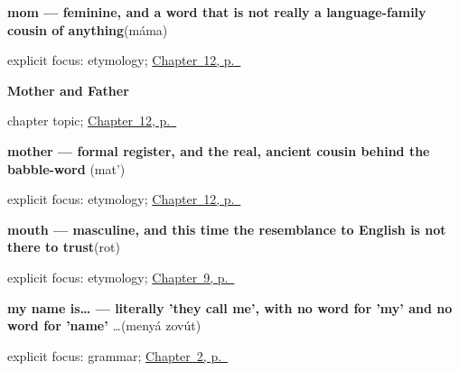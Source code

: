 \noindent\begin{minipage}[t]{\linewidth}
\raggedright
\textbf{mom — feminine, and a word that is not really a language-family cousin of anything}\enspace\emph{}\enspace(máma)\par
\footnotesize explicit focus: etymology; \hyperref[ch:russian-mother-and-father]{Chapter~12, p.~\pageref*{ch:russian-mother-and-father}}
\end{minipage}\par\smallskip

\noindent\begin{minipage}[t]{\linewidth}
\raggedright
\textbf{Mother and Father}\par
\footnotesize chapter topic; \hyperref[ch:russian-mother-and-father]{Chapter~12, p.~\pageref*{ch:russian-mother-and-father}}
\end{minipage}\par\smallskip

\noindent\begin{minipage}[t]{\linewidth}
\raggedright
\textbf{mother — formal register, and the real, ancient cousin behind the babble-word }\enspace\emph{}\enspace(mat')\par
\footnotesize explicit focus: etymology; \hyperref[ch:russian-mother-and-father]{Chapter~12, p.~\pageref*{ch:russian-mother-and-father}}
\end{minipage}\par\smallskip

\noindent\begin{minipage}[t]{\linewidth}
\raggedright
\textbf{mouth — masculine, and this time the resemblance to English is not there to trust}\enspace\emph{}\enspace(rot)\par
\footnotesize explicit focus: etymology; \hyperref[ch:russian-face-parts]{Chapter~9, p.~\pageref*{ch:russian-face-parts}}
\end{minipage}\par\smallskip

\noindent\begin{minipage}[t]{\linewidth}
\raggedright
\textbf{my name is… — literally 'they call me', with no word for 'my' and no word for 'name'}\enspace\emph{ …}\enspace(menyá zovút)\par
\footnotesize explicit focus: grammar; \hyperref[ch:russian-introductions]{Chapter~2, p.~\pageref*{ch:russian-introductions}}
\end{minipage}\par\smallskip


